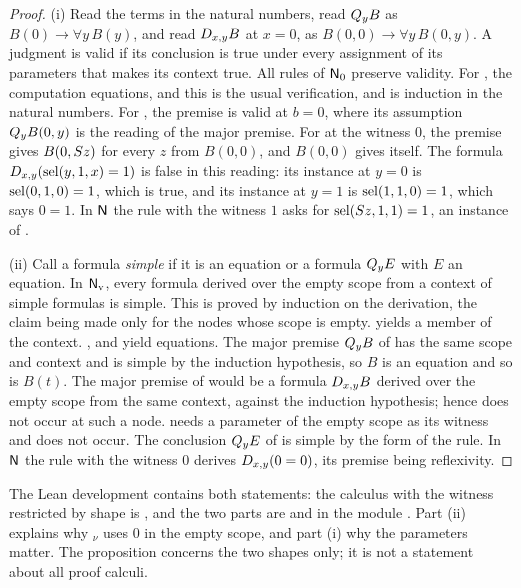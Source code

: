 \begin{proof}
(i) Read the terms in the natural numbers, read $Q_{y}B$ as
$B(0)\to\forall y\,B(y)$, and read $D_{x,y}B$ at $x=0$, as
$B(0,0)\to\forall y\,B(0,y)$.  A judgment is valid if its conclusion is true
under every assignment of its parameters that makes its context true.  All
rules of $\mathsf{N}_{0}$ preserve validity.  For , the computation
equations,  and  this is the usual verification,
and  is induction in the natural numbers.  For ,
the premise is valid at $b=0$, where its assumption $Q_{y}B(0,y)$ is the
reading of the major premise.  For  at the witness $0$, the
premise gives $B(0,S z)$ for every $z$ from $B(0,0)$, and $B(0,0)$ gives
itself.  The formula $D_{x,y}(\operatorname{sel}(y,1,x)=1)$ is false in this reading: its
instance at $y=0$ is $\operatorname{sel}(0,1,0)=1$, which is true, and its instance at
$y=1$ is $\operatorname{sel}(1,1,0)=1$, which says $0=1$.  In $\mathsf{N}$ the rule
 with the witness $1$ asks for $\operatorname{sel}(S z,1,1)=1$, an
instance of .

(ii) Call a formula \emph{simple} if it is an equation or a formula
$Q_{y}E$ with $E$ an equation.  In $\mathsf{N}_{\mathrm v}$, every formula derived
over the empty scope from a context of simple formulas is simple.  This is
proved by induction on the derivation, the claim being made only for the
nodes whose scope is empty.   yields a member of the context.
,  and  yield equations.  The major
premise $Q_{y}B$ of  has the same scope and context and is
simple by the induction hypothesis, so $B$ is an equation and so is $B(t)$.
The major premise of  would be a formula $D_{x,y}B$ derived
over the empty scope from the same context, against the induction
hypothesis; hence  does not occur at such a node.
 needs a parameter of the empty scope as its witness and does
not occur.  The conclusion $Q_{y}E$ of  is simple by the form
of the rule.  In $\mathsf{N}$ the rule  with the witness $0$ derives
$D_{x,y}(0=0)$, its premise being reflexivity.
\end{proof}

The Lean development contains both statements: the calculus with the witness
restricted by shape is , and the two parts are
 and  in the
module .  Part (ii) explains why
$_\nu$ uses $0$ in the empty scope, and part (i) why the
parameters matter.  The proposition concerns the two shapes only; it is not a
statement about all proof calculi.

